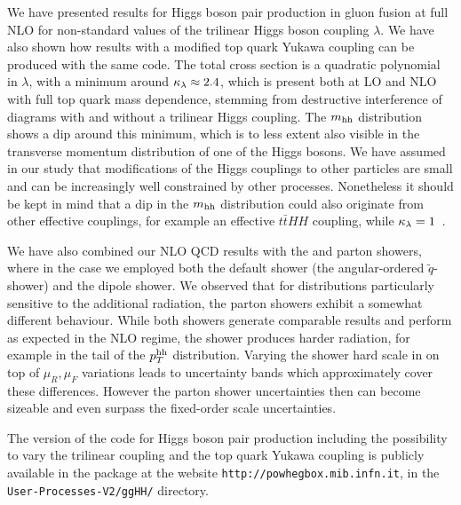 We have presented results for Higgs boson pair production in gluon
fusion at full NLO for non-standard values of the trilinear Higgs
boson coupling $\lambda$. We have also shown how results with a modified 
top quark Yukawa coupling can be produced with the same code.
The total cross section is a quadratic
polynomial in $\lambda$, with a minimum around $\kappa_{\lambda}\approx 2.4$,
which is present both at LO and NLO with full top quark mass
dependence, stemming from destructive interference of diagrams with
and without a trilinear Higgs coupling. 
The $m_{\mathrm{hh}}$ distribution shows a dip around this minimum, which is to
less extent also visible in the transverse momentum distribution of
one of the Higgs bosons. 
We have assumed in our study that modifications of the Higgs couplings
to other particles are small and can be increasingly well constrained by
other processes. Nonetheless it should be kept in mind that a dip in
the $m_{\mathrm{hh}}$ distribution could also originate from other effective
couplings, for example an effective $t\bar{t}HH$ coupling, while
$\kappa_{\lambda}= 1$~\cite{Buchalla:2018yce}.

We have also combined our NLO QCD results with the \pythia and \herwig
parton showers, where in the \herwig case we employed both the default 
shower (the angular-ordered $\tilde{q}$-shower) and the dipole shower.
We observed that for distributions particularly sensitive to the 
additional radiation, the parton showers exhibit a somewhat different 
behaviour. While both \herw showers generate comparable results and 
perform as expected in the NLO regime, the \pythia shower produces harder 
radiation, for example in the tail of the $p_T^{\mathrm{hh}}$
distribution. Varying the shower hard scale in \herwig on top of
$\mu_R,\mu_F$ variations leads to
uncertainty bands which approximately cover these 
differences. However the parton shower uncertainties 
then can become sizeable and even surpass the fixed-order scale uncertainties.

The \powheg{} version of the code for Higgs boson pair production
including the possibility to vary the trilinear coupling 
and the top quark Yukawa coupling 
is publicly available in the  package at the website
{\tt http://powhegbox.mib.infn.it}, in the
{\tt User-Processes-V2/ggHH/} directory.
